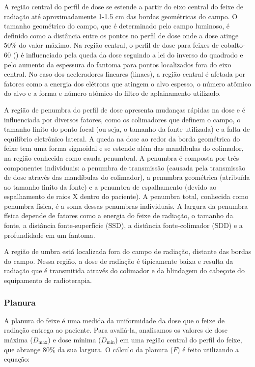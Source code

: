 \documentclass[11pt,a4paper]{article}
\begin{document}
    A região central do perfil de dose se estende a partir do eixo central do feixe de radiação até aproximadamente 1-1.5 cm das bordas geométricas do campo. O tamanho geométrico do campo, que é determinado pelo campo luminoso, é definido como a distância entre os pontos no perfil de dose onde a dose atinge 50\% do valor máximo. Na região central, o perfil de dose para feixes de cobalto-60 () é influenciado pela queda da dose seguindo a lei do inverso do quadrado e pelo aumento da espessura do fantoma para pontos localizados fora do eixo central. No caso dos aceleradores lineares (linacs), a região central é afetada por fatores como a energia dos elétrons que atingem o alvo espesso, o número atômico do alvo e a forma e número atômico do filtro de aplainamento utilizado.

    A região de penumbra do perfil de dose apresenta mudanças rápidas na dose e é influenciada por diversos fatores, como os colimadores que definem o campo, o tamanho finito do ponto focal (ou seja, o tamanho da fonte utilizada) e a falta de equilíbrio eletrônico lateral. A queda na dose ao redor da borda geométrica do feixe tem uma forma sigmoidal e se estende além das mandíbulas do colimador, na região conhecida como cauda penumbral. A penumbra é composta por três componentes individuais: a penumbra de transmissão (causada pela transmissão de dose através das mandíbulas do colimador), a penumbra geométrica (atribuída ao tamanho finito da fonte) e a penumbra de espalhamento (devido ao espalhamento de raios X dentro do paciente). A penumbra total, conhecida como penumbra física, é a soma dessas penumbras individuais. A largura da penumbra física depende de fatores como a energia do feixe de radiação, o tamanho da fonte, a distância fonte-superfície (SSD), a distância fonte-colimador (SDD) e a profundidade em um fantoma.

    A região de umbra está localizada fora do campo de radiação, distante das bordas do campo. Nessa região, a dose de radiação é tipicamente baixa e resulta da radiação que é transmitida através do colimador e da blindagem do cabeçote do equipamento de radioterapia.

\subsubsection*{Planura}

    A planura do feixe é uma medida da uniformidade da dose que o feixe de radiação entrega ao paciente. Para avaliá-la, analisamos os valores de dose máxima ($D_{\text{max}}$) e dose mínima ($D_{\text{min}}$) em uma região central do perfil do feixe, que abrange 80\% da sua largura. O cálculo da planura ($F$) é feito utilizando a equação:
\end{document}
